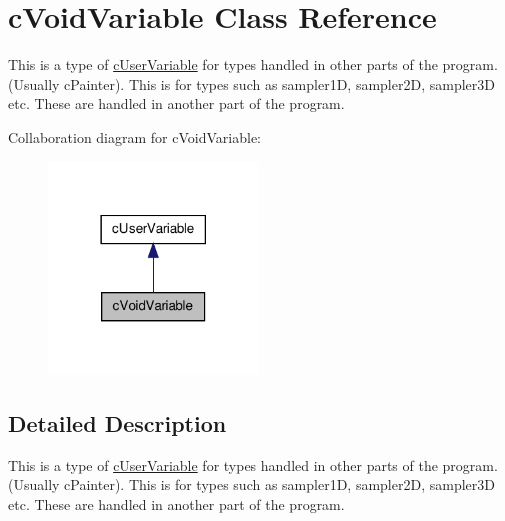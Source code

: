 \hypertarget{classc_void_variable}{
\section{cVoidVariable Class Reference}
\label{classc_void_variable}
}


This is a type of \hyperlink{classc_user_variable}{cUserVariable} for types handled in other parts of the program. (Usually cPainter). This is for types such as sampler1D, sampler2D, sampler3D etc. These are handled in another part of the program.  




Collaboration diagram for cVoidVariable:\nopagebreak
\begin{figure}[H]
\begin{center}
\leavevmode
\includegraphics[width=158pt]{classc_void_variable__coll__graph}
\end{center}
\end{figure}


\subsection{Detailed Description}
This is a type of \hyperlink{classc_user_variable}{cUserVariable} for types handled in other parts of the program. (Usually cPainter). This is for types such as sampler1D, sampler2D, sampler3D etc. These are handled in another part of the program. 